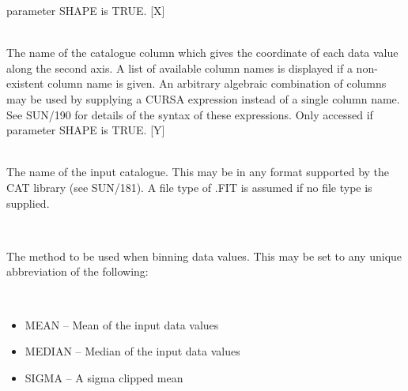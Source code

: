 \documentclass[twoside,11pt]{article}
\newcommand{\xref}[3]{#1}
\renewcommand{\_}{\texttt{\symbol{95}}}
\newcommand{\sstsubsection}[1]{ \item[{#1}] \mbox{} \\}
\newcommand{\sstitemlist}[1]{
  \mbox{} \\
  \vspace{-3.5ex}
  \begin{itemize}
     #1
  \end{itemize}
}
\newcommand{\sstitem}{\item}
\newcommand{\sstsubsection}[1]{\item[{#1}]}
\newcommand{\sstitemlist}[1]{
      \begin{itemize}
         #1
      \end{itemize}
      \\
   }
\newcommand{\sstitem}{\item}
\begin{document}
{{{         parameter SHAPE is TRUE. [X]
      }
      \sstsubsection{
         COLY = LITERAL (Read)
      }{
         The name of the catalogue column which gives the coordinate
         of each data value along the second axis. A list of available column
         names is displayed if a non-existent column name is given. An
         arbitrary algebraic combination of columns may be used by supplying
         a CURSA expression instead of a single column name. See \xref{SUN/190}{sun190}{} for
         details of the syntax of these expressions. Only accessed if
         parameter SHAPE is TRUE. [Y]
      }
      \sstsubsection{
         IN = LITERAL (Read)
      }{
         The name of the input catalogue. This may be in any format
         supported by the CAT library (see \xref{SUN/181}{sun181}{}). A file type of .FIT
         is assumed if no file type is supplied.
      }
      \sstsubsection{
         METHOD = LITERAL (Read)
      }{
         The method to be used when binning data values. This may be
         set to any unique abbreviation of the following:

         \sstitemlist{

            \sstitem
               MEAN      -- Mean of the input data values

            \sstitem
               MEDIAN    -- Median of the input data values

            \sstitem
               SIGMA     -- A sigma clipped mean

}}}}
\end{document}
